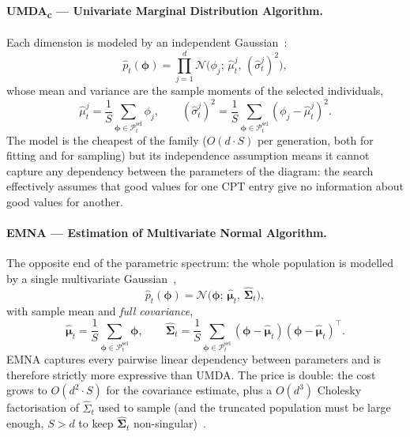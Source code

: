 \paragraph*{UMDA\textsubscript{c} --- Univariate Marginal Distribution
Algorithm.} Each dimension is modeled by an independent
Gaussian~\cite{larranaga2002eda}:
\[
    \hat{p}_t(\boldsymbol{\phi})
    = \prod_{j=1}^{d}
    \mathcal{N}\!\bigl(\phi_j;\,
    \hat{\mu}_t^{j},\,(\hat{\sigma}_t^{j})^{2}\bigr),
\]
whose mean and variance are the sample moments of the selected individuals,
\[
    \hat{\mu}_t^{j}
    = \frac{1}{S}\!\sum_{\boldsymbol{\phi}\in\mathcal{P}_t^{\text{sel}}}\!\phi_j,
    \qquad
    (\hat{\sigma}_t^{j})^{2}
    = \frac{1}{S}\!\sum_{\boldsymbol{\phi}\in\mathcal{P}_t^{\text{sel}}}\!
    (\phi_j - \hat{\mu}_t^{j})^{2}.
\]
The model is the cheapest of the family ($O(d\cdot S)$ per generation,
both for fitting and for sampling) but its independence assumption
means it cannot capture any dependency between the parameters of the
diagram: the search effectively assumes that good values for one CPT
entry give no information about good values for another.
\paragraph*{EMNA --- Estimation of Multivariate Normal Algorithm.}
The opposite end of the parametric spectrum: the whole population is
modelled by a single multivariate Gaussian~\cite{larranaga2002eda},
\[
    \hat{p}_t(\boldsymbol{\phi}) =
    \mathcal{N}\!\bigl(\boldsymbol{\phi};\,
    \hat{\boldsymbol{\mu}}_t,\,
    \hat{\boldsymbol{\Sigma}}_t\bigr),
\]
with sample mean and \emph{full covariance},
\[
    \hat{\boldsymbol{\mu}}_t
    = \frac{1}{S}\!\sum_{\boldsymbol{\phi}\in\mathcal{P}_t^{\text{sel}}}\!\boldsymbol{\phi},
    \qquad
    \hat{\boldsymbol{\Sigma}}_t
    = \frac{1}{S}\!\sum_{\boldsymbol{\phi}\in\mathcal{P}_t^{\text{sel}}}\!
    (\boldsymbol{\phi} - \hat{\boldsymbol{\mu}}_t)
    (\boldsymbol{\phi} - \hat{\boldsymbol{\mu}}_t)^{\!\top}.
\]
EMNA captures every pairwise linear dependency between parameters and
is therefore strictly more expressive than UMDA. The price is
double: the cost grows to $O(d^{2}\cdot S)$ for the covariance estimate,
plus a $O(d^{3})$ Cholesky factorisation of $\hat{\Sigma}_t$ used to sample (and the
truncated population must be large enough, $S>d$
to keep $\hat{\boldsymbol{\Sigma}}_t$
non-singular)~\cite{larranaga2002eda}.

